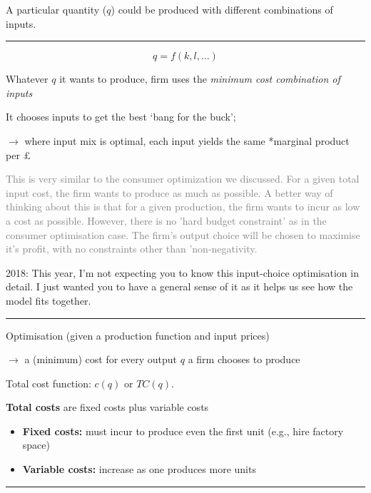 \documentclass[]{article}
\begin{document}
A particular quantity (\(q\)) could be produced with different combinations of inputs.

\begin{center}\rule{0.5\linewidth}{\linethickness}\end{center}

\[q = f(k,l,...)\]

Whatever \(q\) it wants to produce, firm uses the \emph{minimum cost combination of inputs}

It chooses inputs to get the best `bang for the buck';

\(\rightarrow\) where input mix is optimal, each input yields the same *marginal product per \pounds*

\bigskip

\textcolor{gray}{This is very similar to the consumer optimization we discussed. For a given total input cost, the firm wants to produce as much as possible. A better way of thinking about this is that for a given production, the firm wants to incur as low a cost as possible. However, there is no 'hard budget constraint' as in the consumer optimisation case. The firm's output choice will be chosen to maximise it's profit, with no constraints other than 'non-negativity. }

2018: This year, I'm not expecting you to know this input-choice optimisation in detail. I just wanted you to have a general sense of it as it helps us see how the model fits together.

\begin{center}\rule{0.5\linewidth}{\linethickness}\end{center}

Optimisation (given a production function and input prices)

\(\rightarrow\) a (minimum) cost for every output \(q\) a firm chooses to produce

\bigskip

Total cost function: \(c(q)\) or \(TC(q)\).

\textbf{Total costs} are fixed costs plus variable costs

\begin{itemize}
\item
  \textbf{Fixed costs:} must incur to produce even the first unit (e.g., hire factory space)
\item
  \textbf{Variable costs:} increase as one produces more units
\end{itemize}

\begin{center}\rule{0.5\linewidth}{\linethickness}\end{center}
\end{document}
